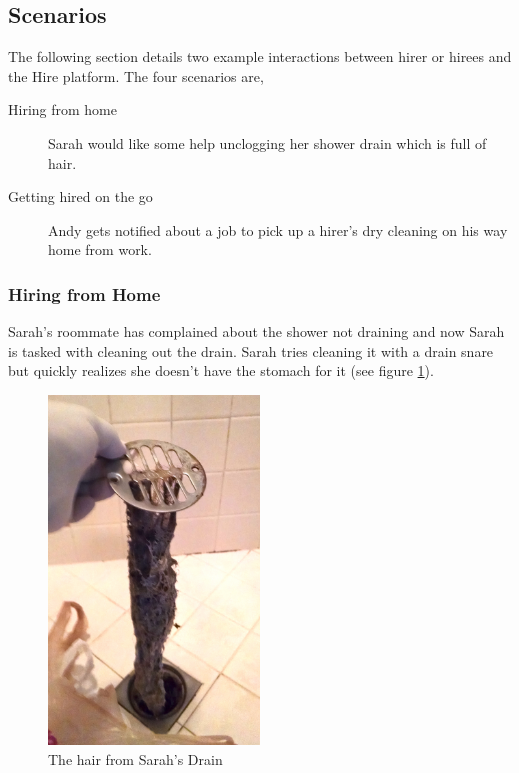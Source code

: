 \documentclass[11pt]{article}
\begin{document}
\subsection{Scenarios}

The following section details two example interactions between hirer or hirees and the Hire platform. The four scenarios are,

\begin{description}
    \item[Hiring from home] Sarah would like some help unclogging her shower drain which is full of hair.
    \item[Getting hired on the go] Andy gets notified about a job to pick up a hirer's dry cleaning on his way home from work.
\end{description}

\subsubsection{Hiring from Home}

Sarah's roommate has complained about the shower not draining and now Sarah is tasked with cleaning out the drain. Sarah tries cleaning it with a drain snare but quickly realizes she doesn't have the stomach for it (see figure \ref{fig:sarahs-drain}).

\begin{figure}[htb]
    \centering
    \includegraphics[width=0.5\textwidth]{Img/showerhair}
    \caption{The hair from Sarah's Drain}\label{fig:sarahs-drain}
\end{figure} 
\end{document}
